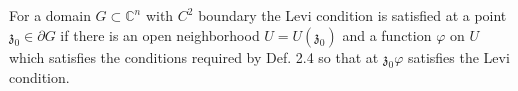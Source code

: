 For a domain $G \subset \mathbb{C}^n$ with $C^2$ boundary the Levi condition is satisfied at a point $\mathfrak{z}_0 \in \partial G$ if there is an open neighborhood $U = U(\mathfrak{z}_0)$ and a function $\varphi$ on $U$ which satisfies the conditions required by Def. 2.4 so that at $\mathfrak{z}_0 \varphi$ satisfies the Levi condition.
